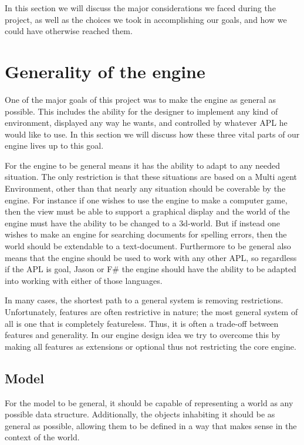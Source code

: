 In this section we will discuss the major considerations we faced
during the project, as well as the choices we took in accomplishing
our goals, and how we could have otherwise reached them.


\section{Generality of the engine\label{sec:DiscussionGenerality}}

One of the major goals of this project was to make the engine as general
as possible. This includes the ability for the designer to implement
any kind of environment, displayed any way he wants, and controlled
by whatever APL he would like to use. In this section we will discuss
how these three vital parts of our engine lives up to this goal.

For the engine to be general means it has the ability to adapt to
any needed situation. The only restriction is that these situations
are based on a Multi agent Environment, other than that nearly any
situation should be coverable by the engine. For instance if one wishes
to use the engine to make a computer game, then the view must be able
to support a graphical display and the world of the engine must have
the ability to be changed to a 3d-world. But if instead one wishes
to make an engine for searching documents for spelling errors, then
the world should be extendable to a text-document. Furthermore to
be general also means that the engine should be used to work with
any other APL, so regardless if the APL is goal, Jason or F\# the
engine should have the ability to be adapted into working with either
of those languages.

In many cases, the shortest path to a general system is removing restrictions.
Unfortunately, features are often restrictive in nature; the most
general system of all is one that is completely featureless. Thus,
it is often a trade-off between features and generality. In our engine
design idea we try to overcome this by making all features as extensions
or optional thus not restricting the core engine.


\subsection*{Model}

For the model to be general, it should be capable of representing
a world as any possible data structure. Additionally, the objects
inhabiting it should be as general as possible, allowing them to be
defined in a way that makes sense in the context of the world. 

